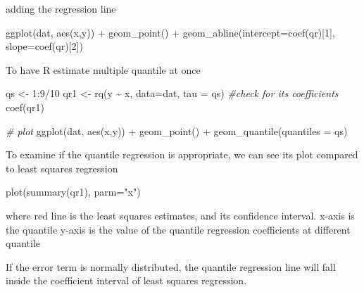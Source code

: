 \documentclass[
]{book}
\newenvironment{Shaded}{\begin{snugshade}}{\end{snugshade}}
\newcommand{\AttributeTok}[1]{\textcolor[rgb]{0.77,0.63,0.00}{#1}}
\newcommand{\CommentTok}[1]{\textcolor[rgb]{0.56,0.35,0.01}{\textit{#1}}}
\newcommand{\DecValTok}[1]{\textcolor[rgb]{0.00,0.00,0.81}{#1}}
\newcommand{\FunctionTok}[1]{\textcolor[rgb]{0.00,0.00,0.00}{#1}}
\newcommand{\NormalTok}[1]{#1}
\newcommand{\OtherTok}[1]{\textcolor[rgb]{0.56,0.35,0.01}{#1}}
\newcommand{\SpecialCharTok}[1]{\textcolor[rgb]{0.00,0.00,0.00}{#1}}
\newcommand{\StringTok}[1]{\textcolor[rgb]{0.31,0.60,0.02}{#1}}
\begin{document}
adding the regression line

\begin{Shaded}
\begin{Highlighting}[]
\FunctionTok{ggplot}\NormalTok{(dat, }\FunctionTok{aes}\NormalTok{(x,y)) }\SpecialCharTok{+} \FunctionTok{geom\_point}\NormalTok{() }\SpecialCharTok{+} 
  \FunctionTok{geom\_abline}\NormalTok{(}\AttributeTok{intercept=}\FunctionTok{coef}\NormalTok{(qr)[}\DecValTok{1}\NormalTok{], }\AttributeTok{slope=}\FunctionTok{coef}\NormalTok{(qr)[}\DecValTok{2}\NormalTok{])}
\end{Highlighting}
\end{Shaded}

To have R estimate multiple quantile at once

\begin{Shaded}
\begin{Highlighting}[]
\NormalTok{qs }\OtherTok{\textless{}{-}} \DecValTok{1}\SpecialCharTok{:}\DecValTok{9}\SpecialCharTok{/}\DecValTok{10}
\NormalTok{qr1 }\OtherTok{\textless{}{-}} \FunctionTok{rq}\NormalTok{(y }\SpecialCharTok{\textasciitilde{}}\NormalTok{ x, }\AttributeTok{data=}\NormalTok{dat, }\AttributeTok{tau =}\NormalTok{ qs)}
\CommentTok{\#check for its coefficients}
\FunctionTok{coef}\NormalTok{(qr1)}

\CommentTok{\# plot}
\FunctionTok{ggplot}\NormalTok{(dat, }\FunctionTok{aes}\NormalTok{(x,y)) }\SpecialCharTok{+} \FunctionTok{geom\_point}\NormalTok{() }\SpecialCharTok{+} \FunctionTok{geom\_quantile}\NormalTok{(}\AttributeTok{quantiles =}\NormalTok{ qs)}
\end{Highlighting}
\end{Shaded}

To examine if the quantile regression is appropriate, we can see its plot compared to least squares regression

\begin{Shaded}
\begin{Highlighting}[]
\FunctionTok{plot}\NormalTok{(}\FunctionTok{summary}\NormalTok{(qr1), }\AttributeTok{parm=}\StringTok{"x"}\NormalTok{)}
\end{Highlighting}
\end{Shaded}

where red line is the least squares estimates, and its confidence interval. x-axis is the quantile y-axis is the value of the quantile regression coefficients at different quantile

If the error term is normally distributed, the quantile regression line will fall inside the coefficient interval of least squares regression.
\end{document}
